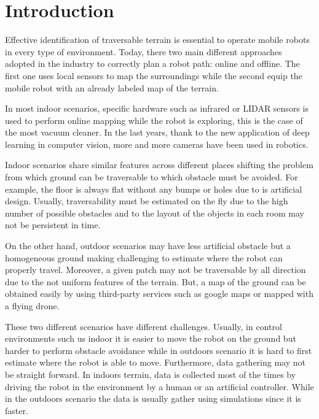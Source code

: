 \documentclass[../document.tex]{subfiles}
\begin{document}
\section{Introduction}
Effective identification of traversable terrain is essential to operate mobile robots in every type of environment. Today, there two main different approaches adopted in the industry to correctly plan a robot path: online and offline. The first one uses local sensors to map the surroundings while the second equip the mobile robot with an already labeled map of the terrain. 

In most indoor scenarios, specific hardware such as infrared or LIDAR sensors is used to perform online mapping while the robot is exploring, this is the case of the most vacuum cleaner. In the last years, thank to the new application of deep learning in computer vision, more and more cameras have been used in robotics.

Indoor scenarios share similar features across different places shifting the problem from which ground can be traversable to which obstacle must be avoided. For example, the floor is always flat without any bumps or holes due to is artificial design. Usually, traversability must be estimated on the fly due to the high number of possible obstacles and to the layout of the objects in each room may not be persistent in time. 

On the other hand, outdoor scenarios may have less artificial obstacle but a homogeneous ground making challenging to estimate where the robot can properly travel. 
Moreover, a given patch may not be traversable by all direction due to the not uniform features of the terrain. But, a map of the ground can be obtained easily by using third-party services such as google maps or mapped with a flying drone. 

These two different scenarios have different challenges. Usually, in control environments such us indoor it is easier to move the robot on the ground but harder to perform obstacle
avoidance while in outdoors scenario it is hard to first estimate where the robot is able to move. 
Furthermore, data gathering may not be straight forward. In indoors terrain, data is collected most of the times by driving the robot in the environment by a human or an artificial
controller. While in the outdoors scenario the data is usually gather using simulations since it is faster. 
\end{document}

